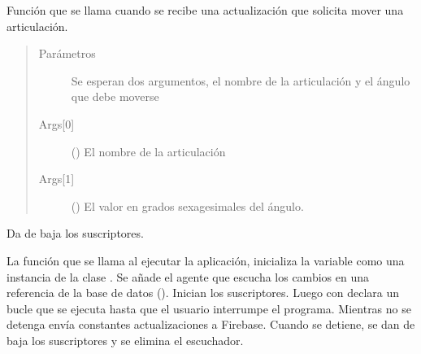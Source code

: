 \begin{fulllineitems}
\label{\detokenize{nao_firebase:fire_nao.move_joint}}
Función que se llama cuando se recibe una actualización que solicita
mover una articulación.
\begin{quote}\begin{description}
\item[{Parámetros}] \leavevmode
{} \textendash{} Se esperan dos argumentos, el nombre de la articulación y el ángulo que debe moverse

\item[{Args{[}0{]}}] \leavevmode
() El nombre de la articulación

\item[{Args{[}1{]}}] \leavevmode
() El valor en grados sexagesimales del ángulo.

\end{description}\end{quote}

\end{fulllineitems}


\begin{fulllineitems}
\label{\detokenize{nao_firebase:fire_nao.off_subscribers}}
Da de baja los suscriptores.

\end{fulllineitems}


\begin{fulllineitems}
\label{\detokenize{nao_firebase:fire_nao.run}}
La función que se llama al ejecutar la aplicación, inicializa la variable
 como una instancia de la clase . Se añade el agente que
escucha los cambios en una referencia de la base de datos ().
Inician los suscriptores. Luego con declara un bucle que se ejecuta
hasta que el usuario interrumpe el programa. Mientras no se detenga
envía constantes actualizaciones a Firebase. Cuando se detiene,
se dan de baja los suscriptores y se elimina el escuchador.

\end{fulllineitems}

